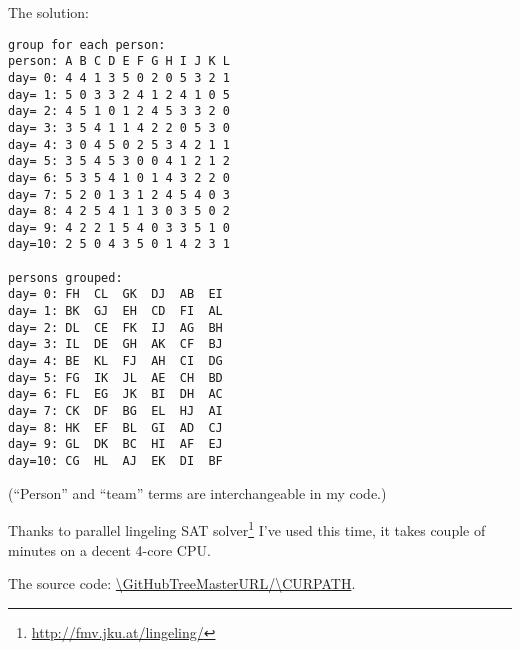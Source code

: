 

The solution:

\begin{lstlisting}
group for each person:
person: A B C D E F G H I J K L
day= 0: 4 4 1 3 5 0 2 0 5 3 2 1
day= 1: 5 0 3 3 2 4 1 2 4 1 0 5
day= 2: 4 5 1 0 1 2 4 5 3 3 2 0
day= 3: 3 5 4 1 1 4 2 2 0 5 3 0
day= 4: 3 0 4 5 0 2 5 3 4 2 1 1
day= 5: 3 5 4 5 3 0 0 4 1 2 1 2
day= 6: 5 3 5 4 1 0 1 4 3 2 2 0
day= 7: 5 2 0 1 3 1 2 4 5 4 0 3
day= 8: 4 2 5 4 1 1 3 0 3 5 0 2
day= 9: 4 2 2 1 5 4 0 3 3 5 1 0
day=10: 2 5 0 4 3 5 0 1 4 2 3 1

persons grouped:
day= 0: FH  CL  GK  DJ  AB  EI
day= 1: BK  GJ  EH  CD  FI  AL
day= 2: DL  CE  FK  IJ  AG  BH
day= 3: IL  DE  GH  AK  CF  BJ
day= 4: BE  KL  FJ  AH  CI  DG
day= 5: FG  IK  JL  AE  CH  BD
day= 6: FL  EG  JK  BI  DH  AC
day= 7: CK  DF  BG  EL  HJ  AI
day= 8: HK  EF  BL  GI  AD  CJ
day= 9: GL  DK  BC  HI  AF  EJ
day=10: CG  HL  AJ  EK  DI  BF
\end{lstlisting}

(``Person'' and ``team'' terms are interchangeable in my code.)

Thanks to 
parallel lingeling SAT solver\footnote{\url{http://fmv.jku.at/lingeling/}}
I've used this time, it takes couple of minutes on a decent 4-core CPU.

The source code: \url{\GitHubTreeMasterURL/\CURPATH}.

